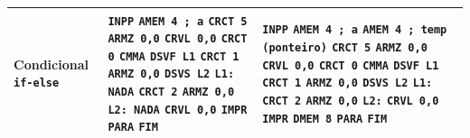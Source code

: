 \documentclass[12pt,a4paper]{article}
\begin{document}
\begin{longtable}{p{2.6cm}p{6.4cm}p{6.4cm}}
\textbf{Condicional \texttt{if-else}} &
\texttt{INPP}\newline
\texttt{AMEM 4 ; a}\newline
\texttt{CRCT 5}\newline
\texttt{ARMZ 0,0}\newline
\texttt{CRVL 0,0}\newline
\texttt{CRCT 0}\newline
\texttt{CMMA}\newline
\texttt{DSVF L1}\newline
\texttt{CRCT 1}\newline
\texttt{ARMZ 0,0}\newline
\texttt{DSVS L2}\newline
\texttt{L1: NADA}\newline
\texttt{CRCT 2}\newline
\texttt{ARMZ 0,0}\newline
\texttt{L2: NADA}\newline
\texttt{CRVL 0,0}\newline
\texttt{IMPR}\newline
\texttt{PARA}\newline
\texttt{FIM} &
\texttt{INPP}\newline
\texttt{AMEM 4 ; a}\newline
\texttt{AMEM 4 ; temp (ponteiro)}\newline
\texttt{CRCT 5}\newline
\texttt{ARMZ 0,0}\newline
\texttt{CRVL 0,0}\newline
\texttt{CRCT 0}\newline
\texttt{CMMA}\newline
\texttt{DSVF L1}\newline
\texttt{CRCT 1}\newline
\texttt{ARMZ 0,0}\newline
\texttt{DSVS L2}\newline
\texttt{L1:}\newline
\texttt{CRCT 2}\newline
\texttt{ARMZ 0,0}\newline
\texttt{L2:}\newline
\texttt{CRVL 0,0}\newline
\texttt{IMPR}\newline
\texttt{DMEM 8}\newline
\texttt{PARA}\newline
\texttt{FIM} \\
\midrule


\end{longtable}
\end{document}
